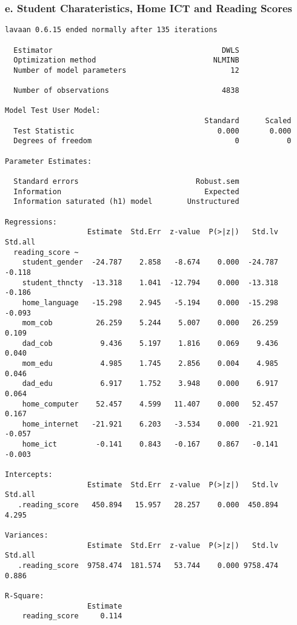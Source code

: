 \documentclass[
]{article}
\begin{document}
\hypertarget{e.-student-charateristics-home-ict-and-reading-scores}{%
\subsubsection{e. Student Charateristics, Home ICT and Reading
Scores}\label{e.-student-charateristics-home-ict-and-reading-scores}}

\begin{verbatim}
lavaan 0.6.15 ended normally after 135 iterations

  Estimator                                       DWLS
  Optimization method                           NLMINB
  Number of model parameters                        12

  Number of observations                          4838

Model Test User Model:
                                              Standard      Scaled
  Test Statistic                                 0.000       0.000
  Degrees of freedom                                 0           0

Parameter Estimates:

  Standard errors                           Robust.sem
  Information                                 Expected
  Information saturated (h1) model        Unstructured

Regressions:
                   Estimate  Std.Err  z-value  P(>|z|)   Std.lv  Std.all
  reading_score ~                                                       
    student_gender  -24.787    2.858   -8.674    0.000  -24.787   -0.118
    student_thncty  -13.318    1.041  -12.794    0.000  -13.318   -0.186
    home_language   -15.298    2.945   -5.194    0.000  -15.298   -0.093
    mom_cob          26.259    5.244    5.007    0.000   26.259    0.109
    dad_cob           9.436    5.197    1.816    0.069    9.436    0.040
    mom_edu           4.985    1.745    2.856    0.004    4.985    0.046
    dad_edu           6.917    1.752    3.948    0.000    6.917    0.064
    home_computer    52.457    4.599   11.407    0.000   52.457    0.167
    home_internet   -21.921    6.203   -3.534    0.000  -21.921   -0.057
    home_ict         -0.141    0.843   -0.167    0.867   -0.141   -0.003

Intercepts:
                   Estimate  Std.Err  z-value  P(>|z|)   Std.lv  Std.all
   .reading_score   450.894   15.957   28.257    0.000  450.894    4.295

Variances:
                   Estimate  Std.Err  z-value  P(>|z|)   Std.lv  Std.all
   .reading_score  9758.474  181.574   53.744    0.000 9758.474    0.886

R-Square:
                   Estimate
    reading_score     0.114
\end{verbatim}
\end{document}
